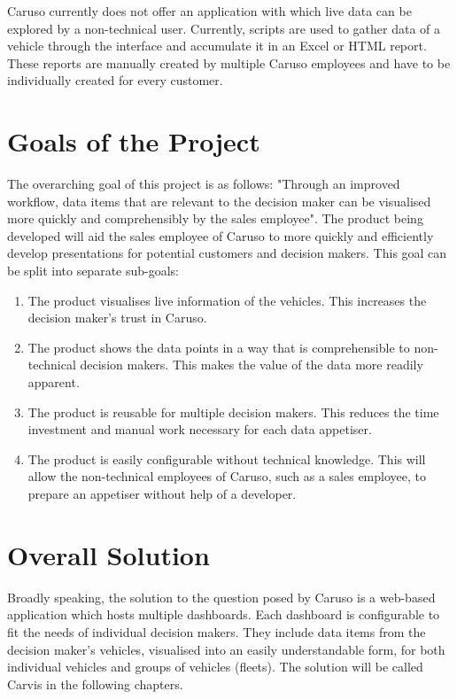 Caruso currently does not offer an application with which live data can be explored by a non-technical user. Currently, scripts are used to gather data of a vehicle through the interface and accumulate it in an Excel or HTML report. These reports are manually created by multiple Caruso employees and have to be individually created for every customer.

\section{Goals of the Project}
The overarching goal of this project is as follows: "Through an improved workflow, data items that are relevant to the decision maker can be visualised more quickly and comprehensibly by the sales employee". The product being developed will aid the sales employee of Caruso to more quickly and efficiently develop presentations for potential customers and decision makers. This goal can be split into separate sub-goals: 
\begin{enumerate}
  \item The product visualises live information of the vehicles. This increases the decision maker's trust in Caruso.
  \item The product shows the data points in a way that is comprehensible to non-technical decision makers. This makes the value of the data more readily apparent.
  \item The product is reusable for multiple decision makers. This reduces the time investment and manual work necessary for each data appetiser.
  \item The product is easily configurable without technical knowledge. This will allow the non-technical employees of Caruso, such as a sales employee, to prepare an appetiser without help of a developer.
\end{enumerate}

\section{Overall Solution}
Broadly speaking, the solution to the question posed by Caruso is a web-based application which hosts multiple dashboards. Each dashboard is configurable to fit the needs of individual decision makers. They include data items from the decision maker's vehicles, visualised into an easily understandable form, for both individual vehicles and groups of vehicles (fleets). The solution will be called Carvis in the following chapters.